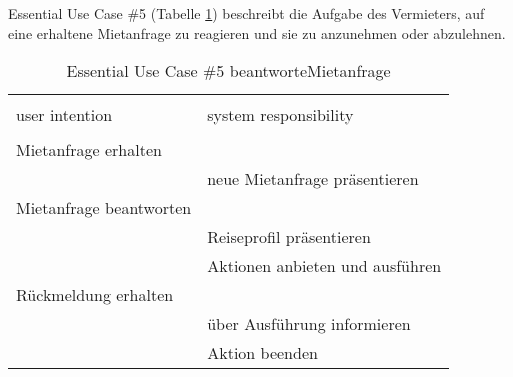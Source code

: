 \newpage
Essential Use Case \#5 (Tabelle \ref{tab:mietanfrage}) beschreibt die Aufgabe des Vermieters, auf eine erhaltene Mietanfrage zu reagieren und sie zu anzunehmen oder abzulehnen.
\begin{table}[H]
\caption{Essential Use Case \#5 beantworteMietanfrage }
\centering
\begin{tabular}{l l}
\\ [-0.5ex]

\hline\hline
\\ [-0.5ex]
user intention & system responsibility
\\ [1.5ex]
\hline
\\ [-0.5ex]
Mietanfrage erhalten       &                                 \\[1ex]
                     & neue Mietanfrage präsentieren            \\[1ex]
Mietanfrage beantworten    &                                 \\[1ex] 
                     & Reiseprofil präsentieren              \\[1ex]
                     & Aktionen anbieten und ausführen          \\[1ex]
Rückmeldung erhalten    &                                 \\[1ex]
                     & über Ausführung informieren           \\[1ex]
                     & Aktion beenden                     \\[1ex]

\hline
\end{tabular}
\label{tab:mietanfrage}
\end{table}


